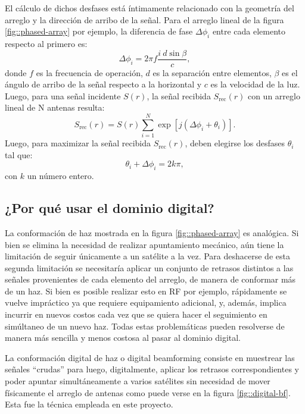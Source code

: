 \documentclass[../../main.tex]{subfiles}
\begin{document}
El cálculo de dichos desfases está íntimamente relacionado con la geometría del arreglo y la dirección de arribo de la señal. Para el arreglo lineal de la figura \ref{fig::phased-array} por ejemplo, la diferencia de fase $\Delta \phi_i$ entre cada elemento respecto al primero es:
\begin{equation}
    \Delta \phi_i = 2 \pi f \frac{i \ d \sin{\beta}}{c},
\end{equation} 
donde $f$ es la frecuencia de operación, $d$ es la separación entre elementos, $\beta$ es el ángulo de arribo de la señal respecto a la horizontal y $c$ es la velocidad de la luz. Luego, para una señal incidente $S(r)$, la señal recibida $S_{\textrm{rec}}(r)$ con un arreglo lineal de N antenas resulta:
\begin{equation}
    S_{\textrm{rec}}(r) = S(r) \sum_{i=1}^{N} \exp[{j (\Delta \phi_i + \theta_i)}].
\end{equation}
Luego, para maximizar la señal recibida $S_{\textrm{rec}}(r)$, deben elegirse los desfases $\theta_i$ tal que:
\begin{equation}
    \theta_i + \Delta \phi_i = 2 k \pi,
\end{equation}
con $k$ un número entero.


\subsection{¿Por qué usar el dominio digital?}

La conformación de haz mostrada en la figura \ref{fig::phased-array} es analógica. Si bien se elimina la necesidad de realizar apuntamiento mecánico, aún tiene la limitación de seguir únicamente a un satélite a la vez. Para deshacerse de esta segunda limitación se necesitaría aplicar un conjunto de retrasos distintos a las señales provenientes de cada elemento del arreglo, de manera de conformar más de un haz.
Si bien es posible realizar esto en RF  por ejemplo, rápidamente se vuelve impráctico ya que requiere equipamiento adicional, y, además, implica incurrir en nuevos costos cada vez que se quiera hacer el seguimiento en simúltaneo de un nuevo haz.
Todas estas problemáticas pueden resolverse de manera más sencilla y menos costosa al pasar al dominio digital. 

La conformación digital de haz o digital beamforming consiste en muestrear las señales ``crudas'' para luego, digitalmente, aplicar los retrasos correspondientes y poder apuntar simultáneamente a varios satélites sin necesidad de mover físicamente el arreglo de antenas como puede verse en la figura \ref{fig::digital-bf}. Esta fue la técnica empleada en este proyecto.
\end{document}
